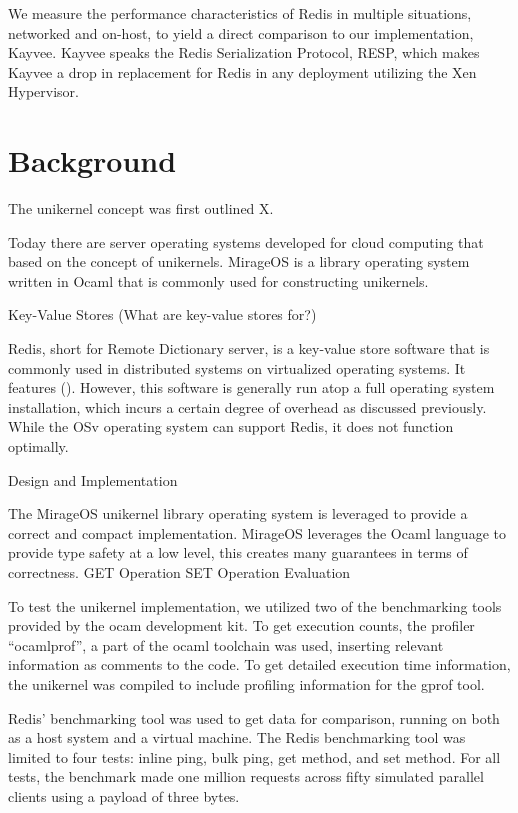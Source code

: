 \documentclass[english,10pt,twocolumn]{article}
\begin{document}
  We measure the performance characteristics of Redis in multiple situations, networked and on-host, to yield a direct comparison to our implementation, Kayvee.
  Kayvee speaks the Redis Serialization Protocol\cite{redis-protocol}, RESP, which makes Kayvee a drop in replacement for Redis in any deployment utilizing the Xen Hypervisor.

\section{Background}
  The unikernel concept was first outlined X.

Today there are server operating systems developed for cloud computing that based on the concept of unikernels. MirageOS is a library operating system written in Ocaml that is commonly used for constructing unikernels.

Key-Value Stores
(What are key-value stores for?) 

Redis, short for Remote Dictionary server, is a key-value store software that is commonly used in distributed systems on virtualized operating systems. It features (). However, this software is generally run atop a full operating system installation, which incurs a certain degree of overhead as discussed previously.  While the OSv operating system can support Redis, it does not function optimally.

Design and Implementation

The MirageOS unikernel library operating system is leveraged to provide a correct and compact implementation. MirageOS leverages the Ocaml language to provide type safety at a low level, this creates many guarantees in terms of correctness.
GET Operation
SET Operation
Evaluation

To test the unikernel implementation, we utilized two of the benchmarking tools provided by the  ocam development kit. To get execution counts, the profiler “ocamlprof”, a part of the ocaml toolchain was used, inserting relevant information as comments to the code. To get detailed execution time information, the unikernel was compiled to include profiling information for the gprof tool.

Redis’ benchmarking tool was used to get data for comparison, running on both as a host system and a virtual machine. The Redis benchmarking tool was limited to four tests: inline ping, bulk ping, get method, and set method. For all tests, the benchmark made one million requests across fifty simulated parallel clients using a payload of three bytes.
\end{document}
